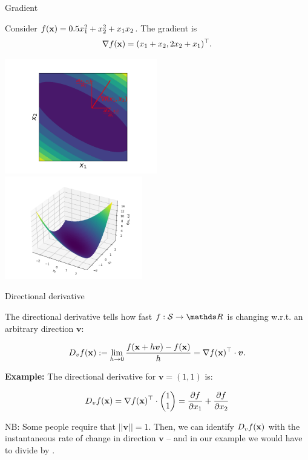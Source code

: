 \documentclass[11pt,compress,t,notes=noshow, xcolor=table]{beamer}
\begin{document}
\begin{vbframe}{Gradient}
\framebreak

Consider $f(\mathbf{x}) = 0.5 x_1^2 + x_2^2 + x_1 x_2$. The gradient is $$\nabla f(\mathbf{x}) = (x_1 + x_2, 2x_2 + x_1)^{\top}.$$

\begin{center}
	\includegraphics[width = 0.5\textwidth]{figure_man/grad_unit_vectors.png} ~~~ \includegraphics[width = 0.45\textwidth]{figure_man/gradient2.png}
\end{center}


\end{vbframe}

\begin{vbframe}{Directional derivative}

The directional derivative tells how fast $f: \mathcal{S} \to \R$ is changing w.r.t. an arbitrary direction $\bm{v}$: 

 $$
   D_v f(\mathbf{x}) := \lim_{h \to 0} \frac{f(\mathbf{x} + h \bm v) - f(\mathbf{x})}{h} = \nabla f(\mathbf{x})^\top \cdot \bm v. 
 $$

 
\textbf{Example: } The directional derivative for $\bm{v} = (1, 1)$ is:

$$
D_v f(\mathbf{x}) = \nabla f(\mathbf{x})^\top \cdot \begin{pmatrix} 1 \\1\end{pmatrix} = \frac{\partial f}{\partial x_1} + \frac{\partial f}{\partial x_2}
$$

NB: Some people require that $||\bm{v}|| = 1$. Then, we can identify $D_v f(\mathbf{x})$ with the instantaneous rate of change in direction $\bm{v}$ -- and in our example we would have to divide by .

\end{vbframe}
\end{document}
